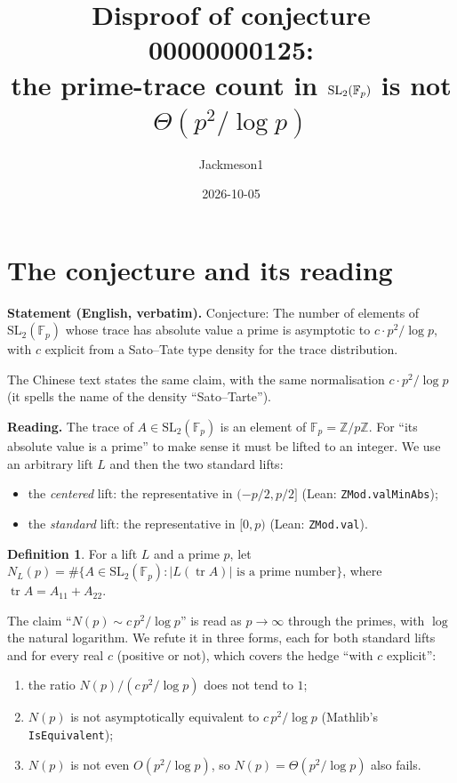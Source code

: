 \documentclass[11pt]{article}
\title{Disproof of conjecture 00000000125:\\ the prime-trace count in $\SL_2(\F_p)$ is not $\Theta(p^2/\log p)$}
\author{Jackmeson1}
\date{2026-10-05}
\theoremstyle{definition}
\newtheorem{definition}[theorem]{Definition}
\newcommand{\tr}{\operatorname{tr}}
\newcommand{\SL}{\mathrm{SL}}
\newcommand{\F}{\mathbb{F}}
\begin{document}
\maketitle

\section{The conjecture and its reading}

\textbf{Statement (English, verbatim).} Conjecture: The number of elements of $\SL_2(\F_p)$ whose
trace has absolute value a prime is asymptotic to $c\cdot p^2/\log p$, with $c$ explicit from a
Sato--Tate type density for the trace distribution.

The Chinese text states the same claim, with the same normalisation $c\cdot p^2/\log p$ (it spells
the name of the density ``Sato--Tarte'').

\textbf{Reading.} The trace of $A\in\SL_2(\F_p)$ is an element of $\F_p=\mathbb{Z}/p\mathbb{Z}$.
For ``its absolute value is a prime'' to make sense it must be lifted to an integer. We use an
arbitrary lift $L$ and then the two standard lifts:
\begin{itemize}
\item the \emph{centered} lift: the representative in $(-p/2,p/2]$ (Lean: \texttt{ZMod.valMinAbs});
\item the \emph{standard} lift: the representative in $[0,p)$ (Lean: \texttt{ZMod.val}).
\end{itemize}

\begin{definition}
For a lift $L$ and a prime $p$, let
$N_L(p)=\#\{A\in\SL_2(\F_p) : |L(\tr A)| \text{ is a prime number}\}$, where $\tr A=A_{11}+A_{22}$.
\end{definition}

The claim ``$N(p)\sim c\,p^2/\log p$'' is read as $p\to\infty$ through the primes, with $\log$ the
natural logarithm. We refute it in three forms, each for both standard lifts and for every real
$c$ (positive or not), which covers the hedge ``with $c$ explicit'':
\begin{enumerate}
\item the ratio $N(p)/(c\,p^2/\log p)$ does not tend to $1$;
\item $N(p)$ is not asymptotically equivalent to $c\,p^2/\log p$ (Mathlib's \texttt{IsEquivalent});
\item $N(p)$ is not even $O(p^2/\log p)$, so $N(p)=\Theta(p^2/\log p)$ also fails.
\end{enumerate}
\end{document}
